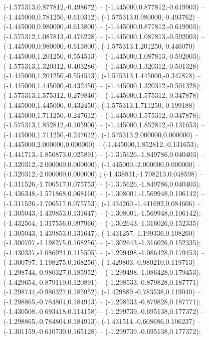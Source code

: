 (-1.575313,0.877812,-0.498672) -- (-1.445000,0.877812,-0.619903) -- (-1.445000,0.781250,-0.610312);
 (-1.575313,0.980000,-0.493762) -- (-1.445000,0.980000,-0.613800) -- (-1.445000,0.877812,-0.619903);
 (-1.575312,1.087813,-0.476228) -- (-1.445000,1.087813,-0.592003) -- (-1.445000,0.980000,-0.613800);
 (-1.575313,1.201250,-0.446070) -- (-1.445000,1.201250,-0.554513) -- (-1.445000,1.087813,-0.592003);
 (-1.575313,1.320312,-0.403286) -- (-1.445000,1.320312,-0.501328) -- (-1.445000,1.201250,-0.554513);
 (-1.575313,1.445000,-0.347878) -- (-1.445000,1.445000,-0.432450) -- (-1.445000,1.320312,-0.501328);
 (-1.575313,1.575312,-0.279846) -- (-1.445000,1.575312,-0.347878) -- (-1.445000,1.445000,-0.432450);
 (-1.575313,1.711250,-0.199188) -- (-1.445000,1.711250,-0.247612) -- (-1.445000,1.575312,-0.347878);
 (-1.575313,1.852812,-0.105906) -- (-1.445000,1.852812,-0.131653) -- (-1.445000,1.711250,-0.247612);
 (-1.575313,2.000000,0.000000) -- (-1.445000,2.000000,0.000000) -- (-1.445000,1.852812,-0.131653);
 (-1.441713,-1.850873,0.025891) -- (-1.315626,-1.849786,0.040403) -- (-1.320312,-2.000000,0.000000);
 (-1.445000,-2.000000,0.000000) -- (-1.320312,-2.000000,0.000000) ;
 (-1.438831,-1.708213,0.048598) -- (-1.311526,-1.706517,0.075753) -- (-1.315626,-1.849786,0.040403);
 (-1.436348,-1.571868,0.068160) -- (-1.308001,-1.569948,0.106142) -- (-1.311526,-1.706517,0.075753);
 (-1.434260,-1.441692,0.084606) -- (-1.305043,-1.439853,0.131647) -- (-1.308001,-1.569948,0.106142);
 (-1.432564,-1.317556,0.097966) -- (-1.302643,-1.316026,0.152335) -- (-1.305043,-1.439853,0.131647);
 (-1.431257,-1.199336,0.108260) -- (-1.300797,-1.198275,0.168256) -- (-1.302643,-1.316026,0.152335);
 (-1.430337,-1.086921,0.115505) -- (-1.299498,-1.086428,0.179453) -- (-1.300797,-1.198275,0.168256);
 (-1.429803,-0.980210,0.119713) -- (-1.298744,-0.980327,0.185952) -- (-1.299498,-1.086428,0.179453);
 (-1.429654,-0.879110,0.120891) -- (-1.298533,-0.879828,0.187771) -- (-1.298744,-0.980327,0.185952);
 (-1.429889,-0.783538,0.119040) -- (-1.298865,-0.784804,0.184913) -- (-1.298533,-0.879828,0.187771);
 (-1.430508,-0.693418,0.114158) -- (-1.299739,-0.695138,0.177372) -- (-1.298865,-0.784804,0.184913);
 (-1.431514,-0.608686,0.106237) -- (-1.301159,-0.610730,0.165128) -- (-1.299739,-0.695138,0.177372);
